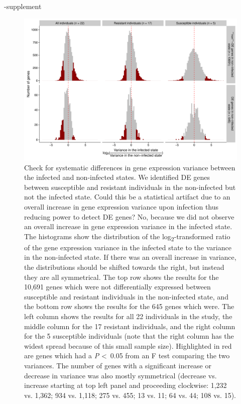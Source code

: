 \documentclass[fleqn,10pt]{wlscirep}
\begin{document}
\begin{filecontents}{\jobname-supplement}
\begin{figure}[ht]
\centering
\includegraphics[width=\linewidth]{../figure/variance.pdf}
\caption{
Check for systematic differences in gene expression variance between
the infected and non-infected states. We identified DE genes between
susceptible and resistant individuals in the non-infected but not the
infected state. Could this be a statistical artifact due to an overall
increase in gene expression variance upon infection thus reducing
power to detect DE genes? No, because we did not observe an overall
increase in gene expression variance in the infected state. The
histograms show the distribution of the
log\textsubscript{2}-transformed ratio of the gene expression variance
in the infected state to the variance in the non-infected state. If
there was an overall increase in variance, the distributions should be
shifted towards the right, but instead they are all symmetrical. The
top row shows the results for the 10,691 genes which were not
differentially expressed between susceptible and resistant individuals
in the non-infected state, and the bottom row shows the results for
the 645 genes which were. The left column shows the results for all 22
individuals in the study, the middle column for the 17 resistant
individuals, and the right column for the 5 susceptible individuals
(note that the right column has the widest spread because of this
small sample size). Highlighted in red are genes which had a \emph{P}
\textless \, 0.05 from an F test comparing the two variances. The
number of genes with a significant increase or decrease in variance
was also mostly symmetrical (decrease vs. increase starting at top
left panel and proceeding clockwise: 1,232 vs. 1,362; 934 vs. 1,118;
275 vs. 455; 13 vs. 11; 64 vs. 44; 108 vs. 15).
}
\label{fig:variance}
\end{figure}



\end{filecontents}
\end{document}

